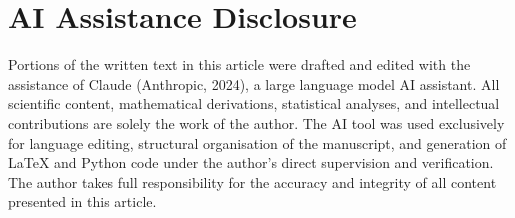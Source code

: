 \documentclass[12pt]{article}
\begin{document}
\section*{AI Assistance Disclosure}

Portions of the written text in this article were drafted and edited with the
assistance of Claude (Anthropic, 2024), a large language model AI assistant.
All scientific content, mathematical derivations, statistical analyses, and
intellectual contributions are solely the work of the author. The AI tool was
used exclusively for language editing, structural organisation of the manuscript,
and generation of \LaTeX{} and Python code under the author's direct supervision
and verification. The author takes full responsibility for the accuracy and
integrity of all content presented in this article.

\newpage


\end{document}
